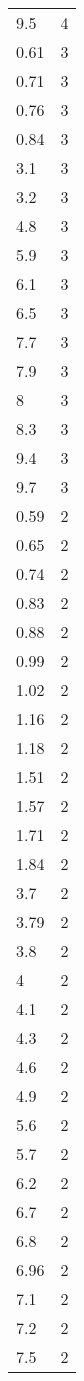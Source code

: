 \begin{table}[ht]
\begin{tabular}{lr}
  9.5 &   4 \\ 
  0.61 &   3 \\ 
  0.71 &   3 \\ 
  0.76 &   3 \\ 
  0.84 &   3 \\ 
  3.1 &   3 \\ 
  3.2 &   3 \\ 
  4.8 &   3 \\ 
  5.9 &   3 \\ 
  6.1 &   3 \\ 
  6.5 &   3 \\ 
  7.7 &   3 \\ 
  7.9 &   3 \\ 
  8 &   3 \\ 
  8.3 &   3 \\ 
  9.4 &   3 \\ 
  9.7 &   3 \\ 
  0.59 &   2 \\ 
  0.65 &   2 \\ 
  0.74 &   2 \\ 
  0.83 &   2 \\ 
  0.88 &   2 \\ 
  0.99 &   2 \\ 
  1.02 &   2 \\ 
  1.16 &   2 \\ 
  1.18 &   2 \\ 
  1.51 &   2 \\ 
  1.57 &   2 \\ 
  1.71 &   2 \\ 
  1.84 &   2 \\ 
  3.7 &   2 \\ 
  3.79 &   2 \\ 
  3.8 &   2 \\ 
  4 &   2 \\ 
  4.1 &   2 \\ 
  4.3 &   2 \\ 
  4.6 &   2 \\ 
  4.9 &   2 \\ 
  5.6 &   2 \\ 
  5.7 &   2 \\ 
  6.2 &   2 \\ 
  6.7 &   2 \\ 
  6.8 &   2 \\ 
  6.96 &   2 \\ 
  7.1 &   2 \\ 
  7.2 &   2 \\ 
  7.5 &   2 \\ 

\end{tabular}
\end{table}
